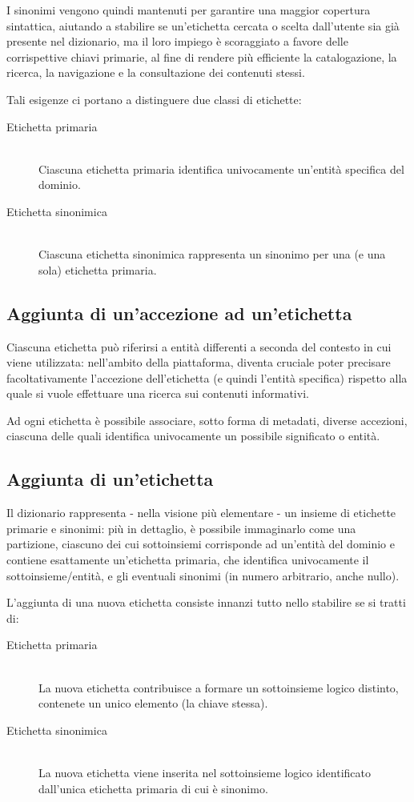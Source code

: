 \documentclass[10pt,a4paper,headinclude,footinclude,hidelinks]{scrreprt} %
\begin{document}
	I sinonimi vengono quindi mantenuti per garantire una maggior copertura sintattica, aiutando a stabilire se un'etichetta cercata o scelta dall'utente sia già presente nel dizionario, ma il loro impiego è scoraggiato a favore delle corrispettive chiavi primarie, al fine di rendere più efficiente la catalogazione, la ricerca, la navigazione e la consultazione dei contenuti stessi.

	Tali esigenze ci portano a distinguere due classi di etichette:
	\begin{description}
	\item[Etichetta primaria] \hfill \\
	Ciascuna etichetta primaria identifica univocamente un'entità specifica del dominio.
	\item[Etichetta sinonimica] \hfill \\
	Ciascuna etichetta sinonimica rappresenta un sinonimo per una (e una sola) etichetta primaria. 
	\end{description}

	\subsection{Aggiunta di un'accezione ad un'etichetta}
	Ciascuna etichetta può riferirsi a entità differenti a seconda del contesto in cui viene utilizzata: nell'ambito della piattaforma, diventa cruciale poter precisare facoltativamente l'accezione dell'etichetta (e quindi l'entità specifica) rispetto alla quale si vuole effettuare una ricerca sui contenuti informativi.

	Ad ogni etichetta è possibile associare, sotto forma di metadati, diverse accezioni, ciascuna delle quali identifica univocamente un possibile significato o entità.
	\subsection{Aggiunta di un'etichetta}
	Il dizionario rappresenta - nella visione più elementare - un insieme di etichette primarie e sinonimi: più in dettaglio, è possibile immaginarlo come una partizione, ciascuno dei cui sottoinsiemi corrisponde ad un'entità del dominio e contiene esattamente un'etichetta primaria, che identifica univocamente il sottoinsieme/entità, e gli eventuali sinonimi (in numero arbitrario, anche nullo).
	
	L'aggiunta di una nuova etichetta consiste innanzi tutto nello stabilire se si tratti di:
	\begin{description}
	\item[Etichetta primaria] \hfill \\
	La nuova etichetta contribuisce a formare un sottoinsieme logico distinto, contenete un unico elemento (la chiave stessa).
 	\item[Etichetta sinonimica] \hfill \\
	La nuova etichetta viene inserita nel sottoinsieme logico identificato dall'unica etichetta primaria di cui è sinonimo.
	\end{description}
	
\end{document}
